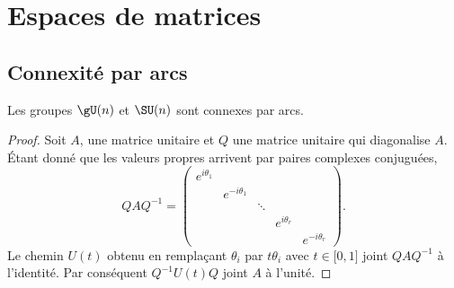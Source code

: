 
\section{Espaces de matrices}

\subsection{Connexité par arcs}

\begin{lemma}
    Les groupes \( \gU(n)\) et \( \SU(n)\) sont connexes par arcs.
\end{lemma}

\begin{proof}
    Soit \( A\), une matrice unitaire et \( Q\) une matrice unitaire qui diagonalise \( A\). Étant donné que les valeurs propres arrivent par paires complexes conjuguées,
    \begin{equation}
        QAQ^{-1}=\begin{pmatrix}
            e^{i\theta_1}    &       &       &       &   \\  
            &    e^{-i\theta_1}    &       &       &   \\  
            &       &    \ddots    &       &   \\  
            &       &       &    e^{i\theta_r}    &   \\  
            &       &       &       &        e^{-i\theta_r}
        \end{pmatrix}.
    \end{equation}
    Le chemin \( U(t)\) obtenu en remplaçant \( \theta_i\) par \( t\theta_i\) avec \( t\in\mathopen[ 0 , 1 \mathclose]\) joint \( QAQ^{-1}\) à l'identité. Par conséquent \( Q^{-1}U(t)Q\) joint \( A\) à l'unité.
\end{proof}


